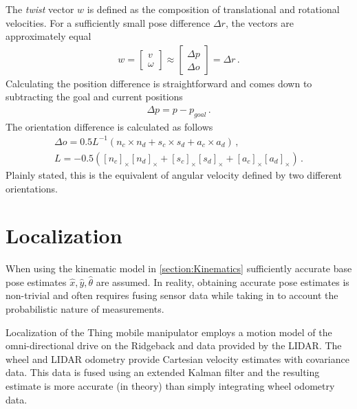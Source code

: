 \documentclass[times, utf8, diplomski, english]{fer}
\begin{document}
The \textit{twist} vector $w$ is defined as the composition of translational and rotational velocities.
For a sufficiently small pose difference $\Delta r$, the vectors are approximately equal
\begin{align}\label{eq:pose_diff}
w  = 
\begin{bmatrix} 
v \\ \omega 
\end{bmatrix} 
\approx 
\begin{bmatrix}
\Delta p \\
\Delta o
\end{bmatrix}
= 
\Delta r \, .
\end{align}
Calculating the position difference is straightforward and comes down to subtracting the goal and current positions
\begin{align}
\Delta p = p - p_{goal}\, .
\end{align}
The orientation difference is calculated as follows \citep{sciavicco2012modelling}
\begin{subequations}\label{eq:pose difference}
\begin{gather}
\Delta o = 0.5 L^{-1} \left( n_c\times n_d + s_c\times s_d + a_c\times a_d \right)\, , \\
L = - 0.5 \left(\left[n_c\right]_{\times}\left[n_d\right]_{\times} + \left[s_c\right]_{\times}\left[s_d\right]_{\times} 
+ \left[a_c\right]_{\times}\left[a_d\right]_{\times} \right)\, .
\end{gather}
\end{subequations}
Plainly stated, this is the equivalent of angular velocity defined by two different orientations.
\section{Localization}\label{section:Localization}
When using the kinematic model in \ref{section:Kinematics} sufficiently accurate base pose estimates $\hat{x},\hat{y},\hat{\theta}$ are assumed.
In reality, obtaining accurate pose estimates is non-trivial and often requires fusing sensor data while taking in to account the probabilistic nature of measurements.

Localization of the Thing mobile manipulator employs a motion model of the omni-directional drive on the Ridgeback and data provided by the LIDAR.
The wheel and LIDAR odometry provide Cartesian velocity estimates with covariance data.
This data is fused using an extended Kalman filter and the resulting estimate is more accurate (in theory) than simply integrating wheel odometry data.
\end{document}
